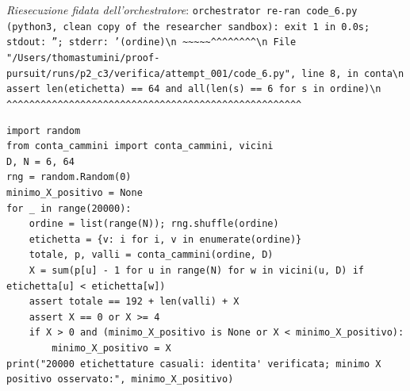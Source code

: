 \documentclass[11pt,a4paper]{article}
\begin{document}
\noindent\emph{Riesecuzione fidata dell'orchestratore}: \texttt{orchestrator re-ran code\_6.py (python3, clean copy of the researcher sandbox): exit 1 in 0.0s; stdout: ''; stderr: '(ordine)\textbackslash{}n                      \textasciitilde{}\textasciitilde{}\textasciitilde{}\textasciitilde{}\textasciitilde{}\textasciicircum{}\textasciicircum{}\textasciicircum{}\textasciicircum{}\textasciicircum{}\textasciicircum{}\textasciicircum{}\textasciicircum{}\textbackslash{}n  File "/Users/thomastumini/proof-pursuit/runs/p2\_c3/verifica/attempt\_001/code\_6.py", line 8, in conta\textbackslash{}n    assert len(etichetta) == 64 and all(len(s) == 6 for s in ordine)\textbackslash{}n           \textasciicircum{}\textasciicircum{}\textasciicircum{}\textasciicircum{}\textasciicircum{}\textasciicircum{}\textasciicircum{}\textasciicircum{}\textasciicircum{}\textasciicircum{}\textasciicircum{}\textasciicircum{}\textasciicircum{}\textasciicircum{}\textasciicircum{}\textasciicircum{}\textasciicircum{}\textasciicircum{}\textasciicircum{}\textasciicircum{}\textasciicircum{}\textasciicircum{}\textasciicircum{}\textasciicircum{}\textasciicircum{}\textasciicircum{}\textasciicircum{}\textasciicircum{}\textasciicircum{}\textasciicircum{}\textasciicircum{}\textasciicircum{}\textasciicircum{}\textasciicircum{}\textasciicircum{}\textasciicircum{}\textasciicircum{}\textasciicircum{}\textasciicircum{}\textasciicircum{}\textasciicircum{}\textasciicircum{}\textasciicircum{}\textasciicircum{}\textasciicircum{}\textasciicircum{}\textasciicircum{}\textasciicircum{}\textasciicircum{}\textasciicircum{}\textasciicircum{}\textasciicircum{}}
\begin{lstlisting}[caption={attempt\_001 code\_7 [python, rigore exact] — Sanity check (evidence only): T = 192 + \#valleys + X and X ∈ \{0\} ∪ [4,∞) on 20000 random l — approvato dal Referee}]
import random
from conta_cammini import conta_cammini, vicini
D, N = 6, 64
rng = random.Random(0)
minimo_X_positivo = None
for _ in range(20000):
    ordine = list(range(N)); rng.shuffle(ordine)
    etichetta = {v: i for i, v in enumerate(ordine)}
    totale, p, valli = conta_cammini(ordine, D)
    X = sum(p[u] - 1 for u in range(N) for w in vicini(u, D) if etichetta[u] < etichetta[w])
    assert totale == 192 + len(valli) + X
    assert X == 0 or X >= 4
    if X > 0 and (minimo_X_positivo is None or X < minimo_X_positivo):
        minimo_X_positivo = X
print("20000 etichettature casuali: identita' verificata; minimo X positivo osservato:", minimo_X_positivo)

\end{lstlisting}
\end{document}
